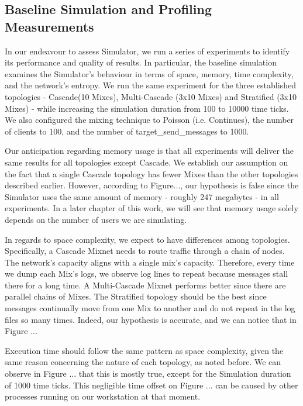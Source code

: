 \documentclass[logo,msc,cyber]{infthesis}   %
\begin{document}
\subsection{Baseline Simulation and Profiling Measurements}

In our endeavour to assess Simulator, we run a series of experiments to identify
its performance and quality of results. In particular, the baseline simulation
examines the Simulator's behaviour in terms of space, memory, time complexity,
and the network's entropy. We run the same experiment for the three established
topologies - Cascade(10 Mixes), Multi-Cascade (3x10 Mixes) and Stratified (3x10
Mixes) - while increasing the simulation duration from 100 to 10000 time ticks.
We also configured the mixing technique to Poisson (i.e. Continues), the number
of clients to 100, and the number of target\_send\_messages to 1000. 

Our anticipation regarding memory usage is that all experiments will deliver the
same results for all topologies except Cascade. We establish our assumption on
the fact that a single Cascade topology has fewer Mixes than the other
topologies described earlier. However, according to Figure..., our hypothesis is
false since the Simulator uses the same amount of memory - roughly 247 megabytes
- in all experiments. In a later chapter of this work, we will see that
memory usage solely depends on the number of users we are simulating.

In regards to space complexity, we expect to have differences among topologies.
Specifically, a Cascade Mixnet needs to route traffic through a chain of
nodes. The network's capacity aligns with a single mix's capacity. Therefore,
every time we dump each Mix's logs, we observe log lines to repeat because
messages stall there for a long time. A Multi-Cascade Mixnet performs better
since there are parallel chains of Mixes. The Stratified topology should be the
best since messages continually move from one Mix to another and do not repeat
in the log files so many times. Indeed, our hypothesis is accurate, and we can
notice that in Figure ...

Execution time should follow the same pattern as space complexity, given the
same reason concerning the nature of each topology, as noted before. We can
observe in Figure ... that this is mostly true, except for the Simulation
duration of 1000 time ticks. This negligible time offset on Figure ...  can be
caused by other processes running on our workstation at that moment.
\end{document}
